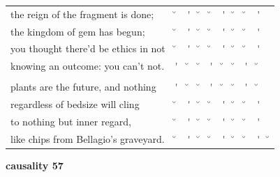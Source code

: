 \documentclass[12pt, landscape]{article}
\begin{document}
\begin{center}
\begin{tabularx}{\textwidth}{
>{\lefting\arraybackslash}X
c
c
c
c
c
c
c
c
c
}

the reign of the fragment is done; & \u{} & \'{} & \u{} & \u{} & \'{} & \u{} & \u{} & \'{} & \\
the kingdom of gem has begun; & \u{} & \'{} & \u{} & \u{} & \'{} & \u{} & \u{} & \'{} & \\
you thought there'd be ethics in not & \u{} & \'{} & \u{} & \u{} & \'{} & \u{} & \u{} & \'{} & \\
knowing an outcome: you can't not. & \'{} & \u{} & \u{} & \'{} & \u{} & \u{} & \'{} & \u{} & \\
 & & & & & & & & \\
plants are the future, and nothing  & \'{} & \u{} & \u{} & \'{} & \u{} & \u{} & \'{} & \u{} & \\
regardless of bedsize will cling & \u{} & \'{} & \u{} & \u{} & \'{} & \u{} & \u{} & \'{} & \\
to nothing but inner regard, & \u{} & \'{} & \u{} & \u{} & \'{} & \u{} & \u{} & \'{} & \\
like chips from Bellagio's graveyard. & \u{} & \'{} & \u{} & \u{} & \'{} & \u{} & \u{} & \'{} & \u{} \\

\end{tabularx}
\end{center}

\vspace*{\fill}

\newpage

\vspace*{\fill}

\noindent \textbf{causality 57}
\noindent \hfill \par
\end{document}
